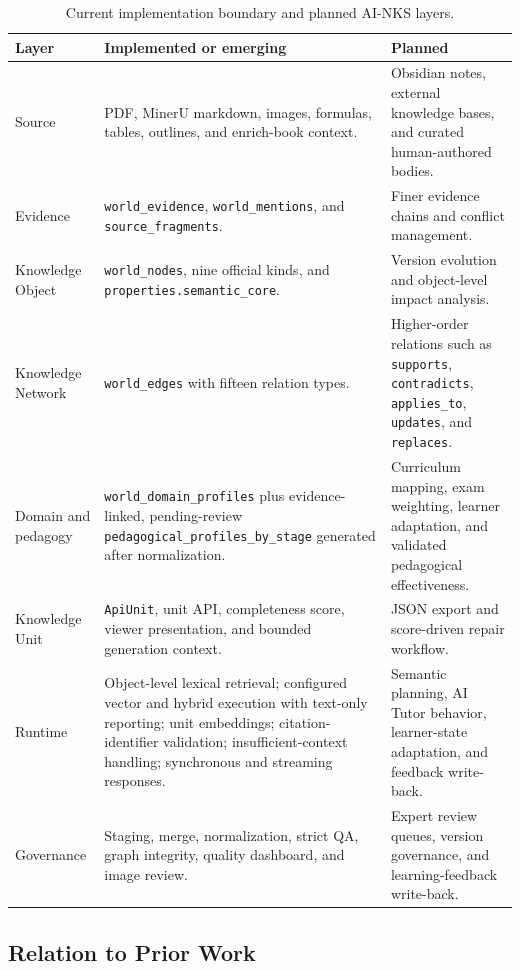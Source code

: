 \documentclass[11pt,letterpaper]{article}
\newcommand{\code}[1]{\nolinkurl{#1}}
\begin{document}
\begin{table}[H]
\centering
\small
\begin{tabularx}{\textwidth}{@{}lYY@{}}
\toprule
\textbf{Layer} & \textbf{Implemented or emerging} & \textbf{Planned}\\
\midrule
Source & PDF, MinerU markdown, images, formulas, tables, outlines, and enrich-book context. & Obsidian notes, external knowledge bases, and curated human-authored bodies.\\
Evidence & \code{world_evidence}, \code{world_mentions}, and \code{source_fragments}. & Finer evidence chains and conflict management.\\
Knowledge Object & \code{world_nodes}, nine official kinds, and \code{properties.semantic_core}. & Version evolution and object-level impact analysis.\\
Knowledge Network & \code{world_edges} with fifteen relation types. & Higher-order relations such as \code{supports}, \code{contradicts}, \code{applies_to}, \code{updates}, and \code{replaces}.\\
Domain and pedagogy & \code{world_domain_profiles} plus evidence-linked, pending-review \code{pedagogical_profiles_by_stage} generated after normalization. & Curriculum mapping, exam weighting, learner adaptation, and validated pedagogical effectiveness.\\
Knowledge Unit & \code{ApiUnit}, unit API, completeness score, viewer presentation, and bounded generation context. & JSON export and score-driven repair workflow.\\
Runtime & Object-level lexical retrieval; configured vector and hybrid execution with text-only reporting; unit embeddings; citation-identifier validation; insufficient-context handling; synchronous and streaming responses. & Semantic planning, AI Tutor behavior, learner-state adaptation, and feedback write-back.\\
Governance & Staging, merge, normalization, strict QA, graph integrity, quality dashboard, and image review. & Expert review queues, version governance, and learning-feedback write-back.\\
\bottomrule
\end{tabularx}
\caption{Current implementation boundary and planned AI-NKS layers.}
\end{table}

\subsection{Relation to Prior Work}
\end{document}
